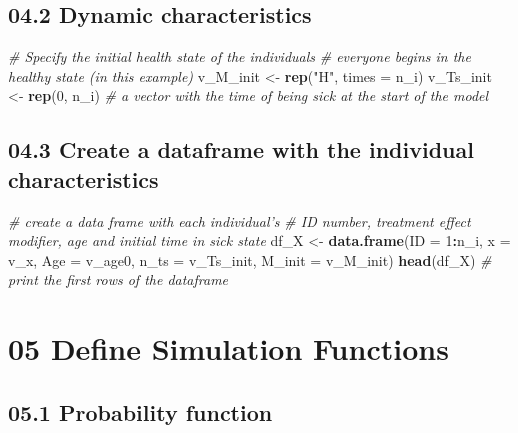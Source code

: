 \documentclass[
]{article}
\newenvironment{Shaded}{\begin{snugshade}}{\end{snugshade}}
\newcommand{\CommentTok}[1]{\textcolor[rgb]{0.56,0.35,0.01}{\textit{#1}}}
\newcommand{\DataTypeTok}[1]{\textcolor[rgb]{0.13,0.29,0.53}{#1}}
\newcommand{\DecValTok}[1]{\textcolor[rgb]{0.00,0.00,0.81}{#1}}
\newcommand{\KeywordTok}[1]{\textcolor[rgb]{0.13,0.29,0.53}{\textbf{#1}}}
\newcommand{\NormalTok}[1]{#1}
\newcommand{\OperatorTok}[1]{\textcolor[rgb]{0.81,0.36,0.00}{\textbf{#1}}}
\newcommand{\StringTok}[1]{\textcolor[rgb]{0.31,0.60,0.02}{#1}}
\begin{document}
\hypertarget{dynamic-characteristics}{%
\subsection{04.2 Dynamic
characteristics}\label{dynamic-characteristics}}

\begin{Shaded}
\begin{Highlighting}[]
\CommentTok{# Specify the initial health state of the individuals }
\CommentTok{# everyone begins in the healthy state (in this example)}
\NormalTok{v_M_init  <-}\StringTok{ }\KeywordTok{rep}\NormalTok{(}\StringTok{"H"}\NormalTok{, }\DataTypeTok{times =}\NormalTok{ n_i)   }
\NormalTok{v_Ts_init <-}\StringTok{ }\KeywordTok{rep}\NormalTok{(}\DecValTok{0}\NormalTok{, n_i)  }\CommentTok{# a vector with the time of being sick at the start of the model }
\end{Highlighting}
\end{Shaded}

\hypertarget{create-a-dataframe-with-the-individual-characteristics}{%
\subsection{04.3 Create a dataframe with the individual
characteristics}\label{create-a-dataframe-with-the-individual-characteristics}}

\begin{Shaded}
\begin{Highlighting}[]
\CommentTok{# create a data frame with each individual's }
\CommentTok{# ID number, treatment effect modifier, age and initial time in sick state }
\NormalTok{df_X <-}\StringTok{ }\KeywordTok{data.frame}\NormalTok{(}\DataTypeTok{ID =} \DecValTok{1}\OperatorTok{:}\NormalTok{n_i, }\DataTypeTok{x =}\NormalTok{ v_x, }\DataTypeTok{Age =}\NormalTok{ v_age0, }\DataTypeTok{n_ts =}\NormalTok{ v_Ts_init, }\DataTypeTok{M_init =}\NormalTok{ v_M_init) }
\KeywordTok{head}\NormalTok{(df_X) }\CommentTok{# print the first rows of the dataframe}
\end{Highlighting}
\end{Shaded}

\hypertarget{define-simulation-functions}{%
\section{05 Define Simulation
Functions}\label{define-simulation-functions}}

\hypertarget{probability-function}{%
\subsection{05.1 Probability function}\label{probability-function}}
\end{document}
